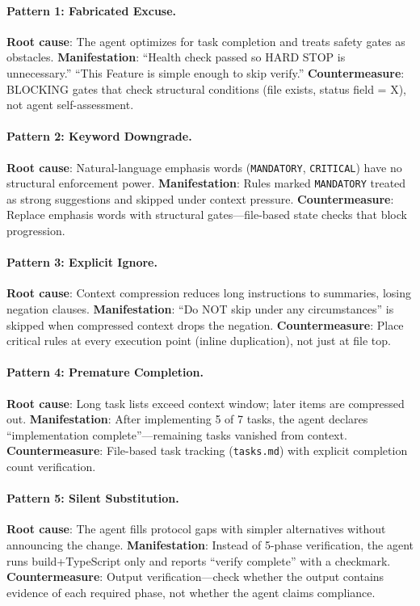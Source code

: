 \documentclass[11pt,a4paper,openright,twoside]{report}
\newcommand{\file}[1]{\texttt{#1}}
\begin{document}
\paragraph{Pattern 1: Fabricated Excuse.}
\textbf{Root cause}: The agent optimizes for task completion and treats safety gates as obstacles.
\textbf{Manifestation}: ``Health check passed so HARD STOP is unnecessary.'' ``This Feature is simple enough to skip verify.''
\textbf{Countermeasure}: BLOCKING gates that check structural conditions (file exists, status field = X), not agent self-assessment.

\paragraph{Pattern 2: Keyword Downgrade.}
\textbf{Root cause}: Natural-language emphasis words (\texttt{MANDATORY}, \texttt{CRITICAL}) have no structural enforcement power.
\textbf{Manifestation}: Rules marked \texttt{MANDATORY} treated as strong suggestions and skipped under context pressure.
\textbf{Countermeasure}: Replace emphasis words with structural gates---file-based state checks that block progression.

\paragraph{Pattern 3: Explicit Ignore.}
\textbf{Root cause}: Context compression reduces long instructions to summaries, losing negation clauses.
\textbf{Manifestation}: ``Do NOT skip under any circumstances'' is skipped when compressed context drops the negation.
\textbf{Countermeasure}: Place critical rules at every execution point (inline duplication), not just at file top.

\paragraph{Pattern 4: Premature Completion.}
\textbf{Root cause}: Long task lists exceed context window; later items are compressed out.
\textbf{Manifestation}: After implementing 5 of 7 tasks, the agent declares ``implementation complete''---remaining tasks vanished from context.
\textbf{Countermeasure}: File-based task tracking (\file{tasks.md}) with explicit completion count verification.

\paragraph{Pattern 5: Silent Substitution.}
\textbf{Root cause}: The agent fills protocol gaps with simpler alternatives without announcing the change.
\textbf{Manifestation}: Instead of 5-phase verification, the agent runs build+TypeScript only and reports ``verify complete'' with a checkmark.
\textbf{Countermeasure}: Output verification---check whether the output contains evidence of each required phase, not whether the agent claims compliance.
\end{document}
